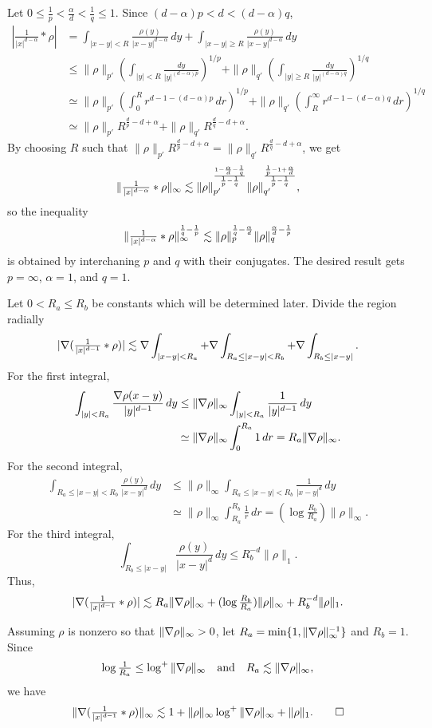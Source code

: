 \documentclass[11pt]{amsart}
\begin{document}
\begin{pfs}
\item
Let $0\le\frac1p<\frac\alpha d<\frac1q\le1$.
Since $(d-\alpha)p<d<(d-\alpha)q$,
\begin{align*}
|\tfrac1{|x|^{d-\alpha}}*\rho|
&=\int_{|x-y|<R}\frac{\rho(y)}{|x-y|^{d-\alpha}}\,dy+\int_{|x-y|\ge R}\frac{\rho(y)}{|x-y|^{d-\alpha}}\,dy\\
&\le\|\rho\|_{p'}(\int_{|y|<R}\frac{dy}{|y|^{(d-\alpha)p}})^{1/p}+\|\rho\|_{q'}(\int_{|y|\ge R}\frac{dy}{|y|^{(d-\alpha)q}})^{1/q}\\
&\simeq\|\rho\|_{p'}(\int_0^Rr^{d-1-(d-\alpha)p}\,dr)^{1/p}+\|\rho\|_{q'}(\int_R^\infty r^{d-1-(d-\alpha)q}\,dr)^{1/q}\\
&\simeq\|\rho\|_{p'}R^{\frac dp-d+\alpha}+\|\rho\|_{q'}R^{\frac dq-d+\alpha}.
\end{align*}
By choosing $R$ such that $\|\rho\|_{p'}R^{\frac dp-d+\alpha}=\|\rho\|_{q'}R^{\frac dq-d+\alpha}$, we get
\[\|\tfrac1{|x|^{d-\alpha}}*\rho\|_\infty\lesssim\|\rho\|_{p'}^{\frac{1-\frac\alpha d-\frac1q}{\frac1p-\frac1q}}\|\rho\|_{q'}^{\frac{\frac1p-1+\frac\alpha d}{\frac1p-\frac1q}},\]
so the inequality
\[\|\tfrac1{|x|^{d-\alpha}}*\rho\|_\infty^{\frac1q-\frac1p}\lesssim\|\rho\|_p^{\frac1q-\frac\alpha d}\|\rho\|_q^{\frac\alpha d-\frac1p}\]
is obtained by interchaning $p$ and $q$ with their conjugates.
The desired result gets $p=\infty$, $\alpha=1$, and $q=1$.

\item
Let $0<R_a\le R_b$ be constants which will be determined later.
Divide the region radially
\begin{align*}
|\nabla(\tfrac1{|x|^{d-1}}*\rho)|\lesssim\nabla\int_{|x-y|<R_a}+\nabla\int_{R_a\le|x-y|<R_b}+\nabla\int_{R_b\le|x-y|}.
\end{align*}
For the first integral,
\begin{align*}
\int_{|y|<R_a}\frac{\nabla\rho(x-y)}{|y|^{d-1}}\,dy
&\le\|\nabla\rho\|_\infty\int_{|y|<R_a}\frac1{|y|^{d-1}}\,dy\\
&\simeq\|\nabla\rho\|_\infty\int_0^{R_a}1\,dr
=R_a\|\nabla\rho\|_\infty.
\end{align*}
For the second integral,
\begin{align*}
\int_{R_a\le|x-y|<R_b}\frac{\rho(y)}{|x-y|^d}\,dy
&\le\|\rho\|_\infty\int_{R_a\le|x-y|<R_b}\frac1{|x-y|^d}\,dy\\
&\simeq\|\rho\|_\infty\int_{R_a}^{R_b}\frac1r\,dr
=(\log\tfrac{R_b}{R_a})\|\rho\|_\infty.
\end{align*}
For the third integral,
\[\int_{R_b\le|x-y|}\frac{\rho(y)}{|x-y|^d}\,dy\le R_b^{-d}\|\rho\|_1.\]
Thus,
\[|\nabla(\tfrac1{|x|^{d-1}}*\rho)|\lesssim R_a\|\nabla\rho\|_\infty+(\log\tfrac{R_b}{R_a})\|\rho\|_\infty+R_b^{-d}\|\rho\|_1.\]

Assuming $\rho$ is nonzero so that $\|\nabla\rho\|_\infty>0$, let $R_a=\min\{1,\|\nabla\rho\|_\infty^{-1}\}$ and $R_b=1$.
Since
\[\log\tfrac1{R_a}\le\log^+\|\nabla\rho\|_\infty\quad\text{and}\quad R_a\lesssim\|\nabla\rho\|_\infty,\]
we have
\[\|\nabla(\tfrac1{|x|^{d-1}}*\rho)\|_\infty\lesssim1+\|\rho\|_\infty\log^+\|\nabla\rho\|_\infty+\|\rho\|_1.\qedhere\]
\end{pfs}
\end{document}
